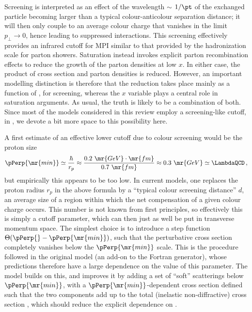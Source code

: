 Screening is interpreted as an effect
of the wavelength $\sim$ $1/\pt$ of the exchanged particle becoming
larger than a typical colour-anticolour separation distance; it will
then only couple to an average colour charge that vanishes in the limit
$p_{\perp} \to 0$, hence leading to suppressed interactions.
This screening effectively provides an infrared cutoff for
MPI similar to that provided by the hadronization
scale for parton showers.
Saturation instead invokes explicit parton
recombination effects to reduce the growth of the parton
densities at low $x$. In either case, the product of cross section and parton densities is reduced. However, an
important modelling distinction is therefore that the reduction takes place
mainly as a function of \pt, for screening, whereas the $x$ variable
plays a central role in saturation arguments. As usual, the truth is
likely to be a combination of both. Since most of the models considered in
this review employ a screening-like cutoff, in \pt, we devote
a bit more space to this possibility here.

A first estimate of an effective lower cutoff due to colour screening would be
the proton size
\begin{equation}
\pPerp{\mr{min}} \simeq \frac{\hbar}{r_{p}} \approx
\frac{0.2~\mr{GeV}\cdot\mr{fm}}{0.7~\mr{fm}} \approx
0.3~\mr{GeV} \simeq \LambdaQCD\,, \label{eq:cutoff}
\end{equation}
but empirically this appears to be too low. In current models, one
replaces the proton radius $r_{p}$ in the above formula by a ``typical
colour screening distance'' $d$, \ie an average size of a region within
which the net compensation of a given colour
charge occurs. This number is not known from first principles, so
effectively this is simply a cutoff parameter, which can then just as
well be put in transverse momentum space.
The simplest choice is to introduce a step function
$\Theta(\pPerp{} - \pPerp{\mr{min}})$, such that the perturbative cross section
completely vanishes below the $\pPerp{\mr{min}}$ scale.
This is the procedure followed in the original \jimmy 
model \cite{Butterworth:1996zw} (an add-on to the Fortran
\herwig generator), whose predictions therefore have
a large dependence on the value of this parameter. The
\herwigpp model \cite{Bahr:2008dy} builds on this, and
improves it by adding a set of
``soft'' scatterings below $\pPerp{\mr{min}}$, with a $\pPerp{\mr{min}}$-dependent
cross section defined such that the two components add up to the
total (inelastic non-diffractive)
cross section \cite{Bahr:2008wk}, which should reduce the explicit
dependence on .

